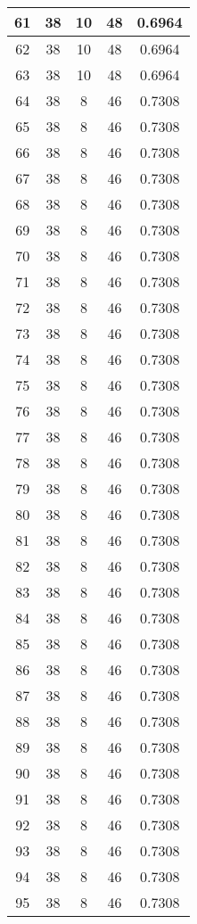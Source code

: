 \documentclass[letterpaper, 12pt]{article}
\begin{document}
\begin{longtable}{|c|c|c|c|c|}
\hline
61 & 38 & 10 & 48 & 0.6964 \\
\hline
62 & 38 & 10 & 48 & 0.6964 \\
\hline
63 & 38 & 10 & 48 & 0.6964 \\
\hline
64 & 38 & 8 & 46 & 0.7308 \\
\hline
65 & 38 & 8 & 46 & 0.7308 \\
\hline
66 & 38 & 8 & 46 & 0.7308 \\
\hline
67 & 38 & 8 & 46 & 0.7308 \\
\hline
68 & 38 & 8 & 46 & 0.7308 \\
\hline
69 & 38 & 8 & 46 & 0.7308 \\
\hline
70 & 38 & 8 & 46 & 0.7308 \\
\hline
71 & 38 & 8 & 46 & 0.7308 \\
\hline
72 & 38 & 8 & 46 & 0.7308 \\
\hline
73 & 38 & 8 & 46 & 0.7308 \\
\hline
74 & 38 & 8 & 46 & 0.7308 \\
\hline
75 & 38 & 8 & 46 & 0.7308 \\
\hline
76 & 38 & 8 & 46 & 0.7308 \\
\hline
77 & 38 & 8 & 46 & 0.7308 \\
\hline
78 & 38 & 8 & 46 & 0.7308 \\
\hline
79 & 38 & 8 & 46 & 0.7308 \\
\hline
80 & 38 & 8 & 46 & 0.7308 \\
\hline
81 & 38 & 8 & 46 & 0.7308 \\
\hline
82 & 38 & 8 & 46 & 0.7308 \\
\hline
83 & 38 & 8 & 46 & 0.7308 \\
\hline
84 & 38 & 8 & 46 & 0.7308 \\
\hline
85 & 38 & 8 & 46 & 0.7308 \\
\hline
86 & 38 & 8 & 46 & 0.7308 \\
\hline
87 & 38 & 8 & 46 & 0.7308 \\
\hline
88 & 38 & 8 & 46 & 0.7308 \\
\hline
89 & 38 & 8 & 46 & 0.7308 \\
\hline
90 & 38 & 8 & 46 & 0.7308 \\
\hline
91 & 38 & 8 & 46 & 0.7308 \\
\hline
92 & 38 & 8 & 46 & 0.7308 \\
\hline
93 & 38 & 8 & 46 & 0.7308 \\
\hline
94 & 38 & 8 & 46 & 0.7308 \\
\hline
95 & 38 & 8 & 46 & 0.7308 \\

\end{longtable}
\end{document}
